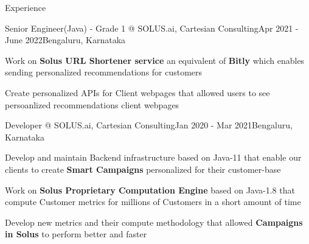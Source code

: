 \documentclass[
	a4paper, %
	12pt, %
]{resume} %
\begin{document}
\begin{rSection}{Experience}
	\hspace{-2em}
	\begin{rSubsection}{Senior Engineer(Java) - Grade 1 @ SOLUS.ai, Cartesian Consulting}{Apr 2021 - June 2022}{}{Bengaluru, Karnataka}
		\item Work on \textbf{Solus URL Shortener service} an equivalent of \textbf{Bitly} which enables sending personalized recommendations for customers  
		\item Create personalized APIs for Client webpages that allowed users to see persoanlized recommendations client webpages 
	\end{rSubsection}
	\hspace{-2em}
	\begin{rSubsection}{ Developer @ SOLUS.ai, Cartesian Consulting}{Jan 2020 - Mar 2021}{}{Bengaluru, Karnataka}
		\item Develop and maintain Backend infrastructure based on Java-11 that enable our clients to create \textbf{ Smart Campaigns} personalized for their customer-base
		\item Work on \textbf{ Solus Proprietary Computation Engine} based on Java-1.8 that compute Customer metrics for millions of Customers in a short amount of time
		\item Develop new metrics and their compute methodology that allowed \textbf{ Campaigns in Solus} to perform better and faster
		
	\end{rSubsection}


\end{rSection}
\end{document}
